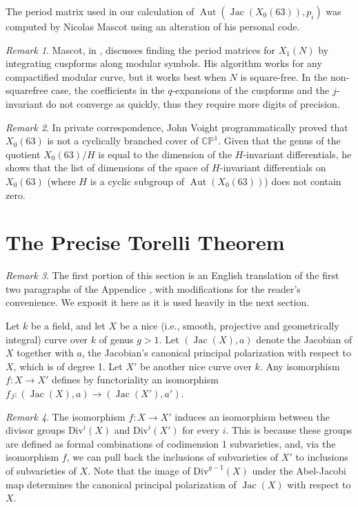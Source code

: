 \documentclass[12pt,reqno]{amsart}
\DeclareMathOperator{\Aut}{Aut}
\DeclareMathOperator{\Jac}{Jac}
\newcommand{\C}{\mathbb{C}}
\renewcommand{\P}{\mathbb{P}}
\theoremstyle{definition}
\theoremstyle{remark}
\newtheorem*{remark}{Remark}
\begin{document}
\vspace{+10pt} 
The period matrix used in our calculation of $\Aut(\Jac(X_0(63)), p_i)$ was computed by Nicolas Mascot using an alteration of his personal code.

\begin{remark} Mascot, in \cite{n}, discusses finding the period matrices for $X_1(N)$ by integrating cuspforms along modular symbols. His algorithm works for any compactified modular curve, but it works best when $N$ is square-free. In the non-squarefree case, the coefficients in the $q$-expansions of the cuspforms and the $j$-invariant do not converge as quickly, thus they require more digits of precision. \end{remark}

\begin{remark} In private correspondence, John Voight programmatically proved that $X_0(63)$ is not a cyclically branched cover of $\C\P^1.$ Given that the genus of the quotient $X_0(63)/H$ is equal to the dimension of the $H$-invariant differentials, he shows that the list of dimensions of the space of $H$-invariant differentials on $X_0(63)$ (where $H$ is a cyclic subgroup of $\Aut(X_0(63))$) does not contain zero. 
 \end{remark} 




\section{The Precise Torelli Theorem}
\label{sec:torelli}


\begin{remark} The first portion of this section is an English translation of the first two paragraphs of the Appendice \cite{Torelli}, with modifications for the reader's convenience. We exposit it here as it is used heavily in the next section. \end{remark}

Let $k$ be a field, and let $X$ be a nice (i.e., smooth, projective and geometrically integral) curve over $k$ of genus $g > 1$.  Let $(\operatorname{Jac}(X),a)$ denote the Jacobian of $X$ together with $a$, the Jacobian's canonical principal polarization with respect to $X$, which is of degree 1.  Let $X'$ be another nice curve over $k.$ Any isomorphism $f: X \to X'$ defines by functoriality an isomorphism $f_J: (\Jac(X), a) \to (\Jac(X'), a')$. 

\begin{remark} The isomorphism $f: X \to X'$ induces an isomorphism between the divisor groups $\text{Div}^i(X)$ and $\text{Div}^i(X')$ for every $i$. This is because these groups are defined as formal combinations of codimension 1 subvarieties, and, via the isomorphism $f$, we can pull back the inclusions of subvarieties of $X'$ to inclusions of subvarieties of $X$. Note that the image of $\text{Div}^{g-1}(X)$ under the Abel-Jacobi map determines the canonical principal polarization of $\Jac(X)$ with respect to $X$. \end{remark}
\end{document}
